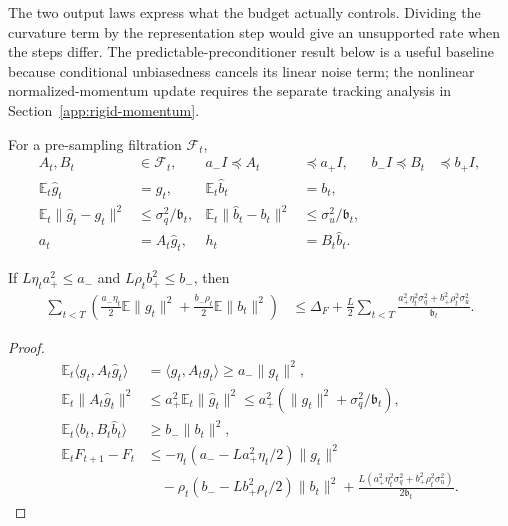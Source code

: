 The two output laws express what the budget actually controls. Dividing the curvature term by the representation step would give an unsupported rate when the steps differ. The predictable-preconditioner result below is a useful baseline because conditional unbiasedness cancels its linear noise term; the nonlinear normalized-momentum update requires the separate tracking analysis in Section~\ref{app:rigid-momentum}.

\begin{assumption}
For a pre-sampling filtration $\mathcal F_t$,
\begin{align}
 A_t,B_t&\in\mathcal F_t,&
 a_-I\preceq A_t&\preceq a_+I,&b_-I\preceq B_t&\preceq b_+I,\\
 \mathbb E_t\widehat g_t&=g_t,&
 \mathbb E_t\widehat b_t&=b_t,\\
 \mathbb E_t\|\widehat g_t-g_t\|^2&\le\sigma_q^2/\mathfrak b_t,&
 \mathbb E_t\|\widehat b_t-b_t\|^2&\le\sigma_u^2/\mathfrak b_t,\\
 a_t&=A_t\widehat g_t,&h_t&=B_t\widehat b_t.
\end{align}
\end{assumption}
\begin{theorem}
If $L\eta_ta_+^2\le a_-$ and $L\rho_tb_+^2\le b_-$, then
\begin{align}\label{eq:unbiased-budget}
 \sum_{t<T}\left(\tfrac{a_-\eta_t}{2}\mathbb E\|g_t\|^2+
 \tfrac{b_-\rho_t}{2}\mathbb E\|b_t\|^2\right)
 &\le\Delta_F+
 \tfrac L2\sum_{t<T}\frac{a_+^2\eta_t^2\sigma_q^2+b_+^2\rho_t^2\sigma_u^2}{\mathfrak b_t}.
\end{align}
\end{theorem}
\begin{proof}
\begin{align}
 \mathbb E_t\langle g_t,A_t\widehat g_t\rangle
 &=\langle g_t,A_tg_t\rangle\ge a_-\|g_t\|^2,\\
 \mathbb E_t\|A_t\widehat g_t\|^2
 &\le a_+^2\mathbb E_t\|\widehat g_t\|^2
 \le a_+^2(\|g_t\|^2+\sigma_q^2/\mathfrak b_t),\\
 \mathbb E_t\langle b_t,B_t\widehat b_t\rangle
 &\ge b_-\|b_t\|^2,\\
 \mathbb E_tF_{t+1}-F_t
 &\le-\eta_t(a_--La_+^2\eta_t/2)\|g_t\|^2\\
 &\quad-\rho_t(b_--Lb_+^2\rho_t/2)\|b_t\|^2
 +\frac{L(a_+^2\eta_t^2\sigma_q^2+b_+^2\rho_t^2\sigma_u^2)}{2\mathfrak b_t}.
\end{align}
\end{proof}

